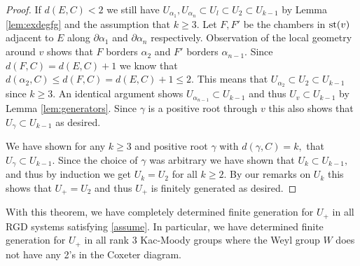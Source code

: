 \documentclass[class=book, crop=false]{standalone}
\begin{document}
\begin{proof}
	If $d(E,C)<2$ we still have $U_{\alpha_1},U_{\alpha_n}\subset U_l\subset U_2\subset U_{k-1}$ by Lemma \ref{lem:exdegfg} and the assumption that $k\ge 3.$ Let $F,F'$ be the chambers in $\mathrm{st}(v)$ adjacent to $E$ along $\partial\alpha_1$ and $\partial\alpha_n$ respectively. Observation of the local geometry around $v$ shows that $F$ borders $\alpha_2$ and $F'$ borders $\alpha_{n-1}.$ Since $d(F,C)=d(E,C)+1$ we know that $d(\alpha_2,C)\le d(F,C)=d(E,C)+1\le 2.$ This means that $U_{\alpha_2}\subset U_2\subset U_{k-1}$ since $k\ge 3.$ An identical argument shows $U_{\alpha_{n-1}}\subset U_{k-1}$ and thus $U_v\subset U_{k-1}$ by Lemma \ref{lem:generators}. Since $\gamma$ is a positive root through $v$ this also shows that $U_\gamma \subset U_{k-1}$ as desired.

	We have shown for any $k\ge 3$ and positive root $\gamma$ with $d(\gamma,C)=k,$ that $U_\gamma\subset U_{k-1}.$ Since the choice of $\gamma$ was arbitrary we have shown that $U_k\subset U_{k-1},$ and thus by induction we get $U_k=U_2$ for all $k\ge 2.$ By our remarks on $U_k$ this shows that $U_+=U_2$ and thus $U_+$ is finitely generated as desired.
\end{proof}

With this theorem, we have completely determined finite generation for $U_+$ in all RGD systems satisfying \eqref{assume}. In particular, we have determined finite generation for $U_+$ in all rank 3 Kac-Moody groups where the Weyl group $W$ does not have any 2's in the Coxeter diagram. 
\end{document}

